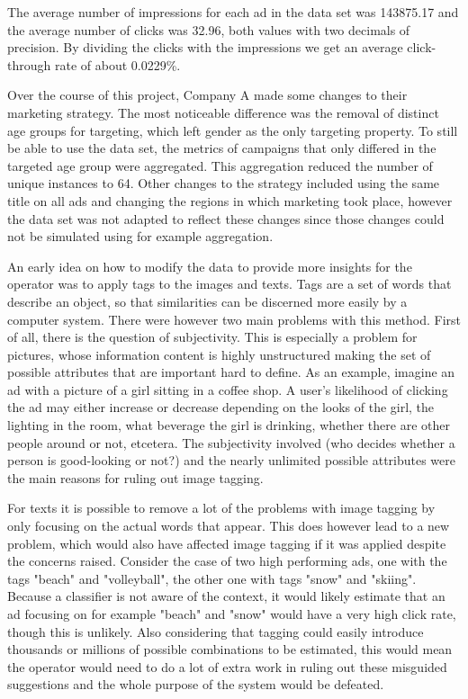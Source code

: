 \documentclass{sig-alternate}
\begin{document}
The average number of impressions for each ad in the data set was 143875.17 and the average number of clicks was 32.96, both values with two decimals of precision. By dividing the clicks with the impressions we get an average click-through rate of about 0.0229\%.

Over the course of this project, Company A made some changes to their marketing strategy. The most noticeable difference was the removal of distinct age groups for targeting, which left gender as the only targeting property. To still be able to use the data set, the metrics of campaigns that only differed in the targeted age group were aggregated. This aggregation reduced the number of unique instances to 64. Other changes to the strategy included using the same title on all ads and changing the regions in which marketing took place, however the data set was not adapted to reflect these changes since those changes could not be simulated using for example aggregation.

An early idea on how to modify the data to provide more insights for the operator was to apply tags to the images and texts. Tags are a set of words that describe an object, so that similarities can be discerned more easily by a computer system. There were however two main problems with this method. First of all, there is the question of subjectivity. This is especially a problem for pictures, whose information content is highly unstructured making the set of possible attributes that are important hard to define. As an example, imagine an ad with a picture of a girl sitting in a coffee shop. A user's likelihood of clicking the ad may either increase or decrease depending on the looks of the girl, the lighting in the room, what beverage the girl is drinking, whether there are other people around or not, etcetera. The subjectivity involved (who decides whether a person is good-looking or not?) and the nearly unlimited possible attributes were the main reasons for ruling out image tagging.

For texts it is possible to remove a lot of the problems with image tagging by only focusing on the actual words that appear. This does however lead to a new problem, which would also have affected image tagging if it was applied despite the concerns raised. Consider the case of two high performing ads, one with the tags "beach" and "volleyball", the other one with tags "snow" and "skiing". Because a classifier is not aware of the context, it would likely estimate that an ad focusing on for example "beach" and "snow" would have a very high click rate, though this is unlikely. Also considering that tagging could easily introduce thousands or millions of possible combinations to be estimated, this would mean the operator would need to do a lot of extra work in ruling out these misguided suggestions and the whole purpose of the system would be defeated.
\end{document}
